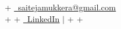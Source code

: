 \documentclass[letterpaper,10pt]{article}                                                                                                                                                                                                                                                                                                                                                                                                                                                                                                                                                                         +
\begin{document}
\begin{center}
                                                                                                                                                                                                                                                                                                                                                                                                                                                                                                                                                                                                                   +
     \href{mailto:saitejamukkera@gmail.com}{\faEnvelope \ \underline{saitejamukkera@gmail.com}} \\ \vspace{2pt}                                                                                                                                                                                                                                                                                                                                                                                                                                                                                                    +
                                                                                                                                                                                                                                                                                                                                                                                                                                                                                                                                                                                                                   +
     \href{https://linkedin.com/in/saiteja-mukkera}{\faLinkedin \ \underline{LinkedIn}} $|$                                                                                                                                                                                                                                                                                                                                                                                                                                                                                                                        +
                                                                                                                                                                                                                                                                                                                                                                                                                                                                                                                                                                                                                   +

\end{center}
\end{document}
